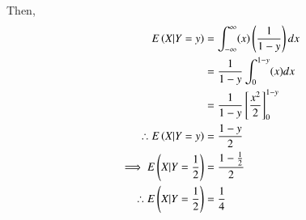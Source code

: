 Then, 
\begin{align}
   E\left(X|Y=y\right) & =
   \int_{-\infty}^{\infty} (x)\left(\frac{1}{1-y}\right)dx\\
    & = \frac{1}{1-y} \int_{0}^{1-y}(x)dx\\
    & = \frac{1}{1-y} \left[ \frac{x^2}{2} \right]_{0}^{1-y} \\
\therefore  E\left(X|Y=y\right)& = \frac{1-y}{2}\\
\implies  E\left(X|Y=\frac{1}{2}\right) & = \frac{1-\frac{1}{2}}{2}\\
\therefore E\left(X|Y= \frac{1}{2}\right) &= \frac{1}{4}
\end{align}